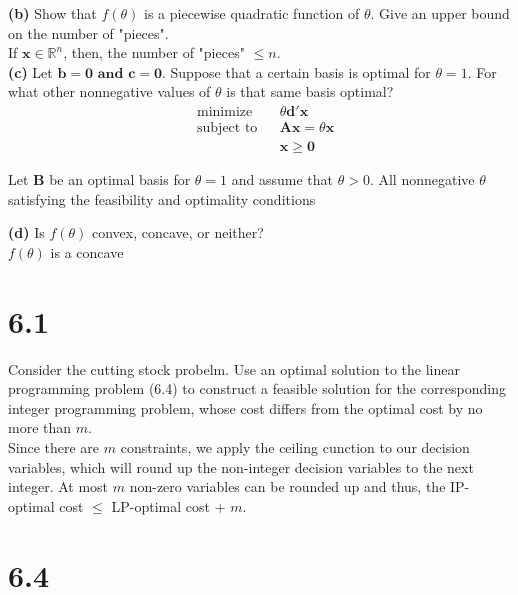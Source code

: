 \documentclass{article}
\begin{document}
\noindent
\textbf{(b)}  Show that $f(\theta)$ is a piecewise quadratic function of $\theta$.  Give an upper bound on the number of "pieces". \\

\noindent
If $\mathbf{x} \in \mathbb{R}^n$, then, the number of "pieces" $\leq n$. \\


\noindent
\textbf{(c)}  Let $\mathbf{b = 0 \text{ and } c = 0}$.  Suppose that a certain basis is optimal for $\theta = 1$.  For what other nonnegative values of $\theta$ is that same basis optimal? \\

\noindent
\begin{equation*}
\begin{aligned}
& \text{minimize} && \theta\mathbf{d'x} \\
& \text{subject to} && \mathbf{Ax = } \theta \mathbf{x} \\
& && \mathbf{x \geq 0}
\end{aligned}
\end{equation*}

Let $\mathbf{B}$ be an optimal basis for $\theta = 1$ and assume that $\theta > 0$.  All nonnegative $\theta$ satisfying the feasibility and optimality conditions 


\noindent
\textbf{(d)} Is $f(\theta)$ convex, concave, or neither? \\

\noindent
$f(\theta)$ is a concave 

\section*{6.1}
Consider the cutting stock probelm.  Use an optimal solution to the linear programming problem (6.4) to construct a feasible solution for the corresponding integer programming problem, whose cost differs from the optimal cost by no more than $m$.  \\

\noindent
Since there are $m$ constraints, we apply the ceiling cunction to our decision variables, which will round up the non-integer decision variables to the next integer.  At most $m$ non-zero variables can be rounded up and thus, the IP-optimal cost $\leq$ LP-optimal cost + $m$. \\

\section*{6.4}
\end{document}
